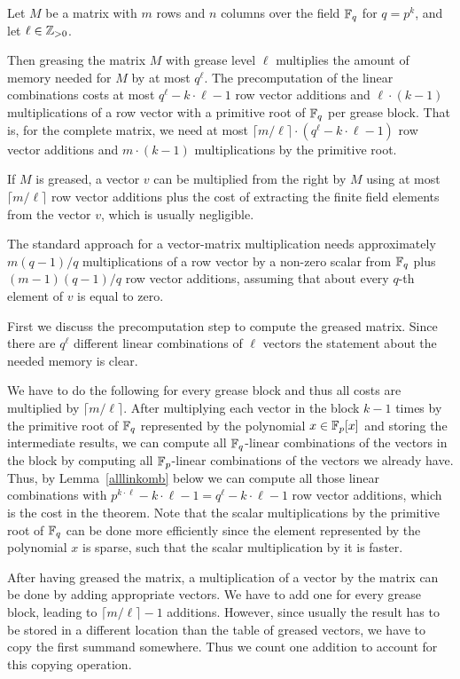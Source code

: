 \begin{Theo}
\label{theogrease}
%
Let $M$ be a matrix with $m$ rows and $n$ columns over the field\/ $\mathbb{F}_q$
for $q = p^k$, and let $\ell \in \mathbb{Z}_{> 0}$.

Then greasing the matrix $M$ with grease level $\ell$ multiplies the amount
of memory needed for $M$ by at most $q^\ell$. The precomputation of the
linear combinations costs at most 
$q^\ell-k\cdot \ell -1$ row vector additions 
and $\ell \cdot (k-1)$ multiplications of a row vector with a primitive
root of\/ $\mathbb{F}_q$ per grease block. That is, for the complete matrix, we
need at most $\lceil m/\ell \rceil \cdot (q^\ell-k\cdot \ell -1)$ row
vector additions and $m \cdot (k-1)$ multiplications by the primitive
root.

If $M$ is greased, a vector $v$ can be multiplied from the right by $M$
using at most $\lceil m/\ell \rceil$ row vector additions plus the 
cost of extracting the finite field elements from the vector $v$, which
is usually negligible.

The standard approach for a vector-matrix multiplication needs 
approximately $m(q-1)/q$ multiplications of a row vector by a non-zero
scalar from\/ $\mathbb{F}_q$ plus $(m-1)(q-1)/q$ row vector additions, assuming that 
about every $q$-th element of $v$ is equal to zero.
\end{Theo}
\Proof First we discuss the precomputation step to compute the greased
matrix. Since there are $q^\ell$ different linear combinations of $\ell$ 
vectors the statement about the needed memory is clear.

We have to do the following for every grease block and thus 
all costs are multiplied by $\lceil m/\ell \rceil$. 
After multiplying each vector in the
block $k-1$ times by the primitive root of $\mathbb{F}_q$ represented by the
polynomial $x \in \mathbb{F}_p[x]$ and storing the intermediate results, 
we can compute all $\mathbb{F}_q$-linear combinations
of the vectors in the block by computing all $\mathbb{F}_p$-linear combinations
of the vectors we already have. Thus, by Lemma~\ref{alllinkomb} below we can
compute all those linear combinations with 
$p^{k\cdot \ell} - k\cdot \ell - 1 = 
q^\ell - k \cdot \ell - 1$ row vector additions, which is the cost in the
theorem. Note that the scalar multiplications by the
primitive root of\/ $\mathbb{F}_q$ can be done
more efficiently since the element represented by the polynomial $x$
is sparse, such that the scalar multiplication by it is faster.

After having greased the matrix, a multiplication of a vector by 
the matrix can be done by adding appropriate vectors. We have to add
one for every grease block, leading to $\lceil m/\ell \rceil - 1$ additions.
However, since usually the result has to be stored in a different location
than the table of greased vectors, we have to copy the first summand
somewhere. Thus we count one addition to account for this copying operation.
\ProofEnd

